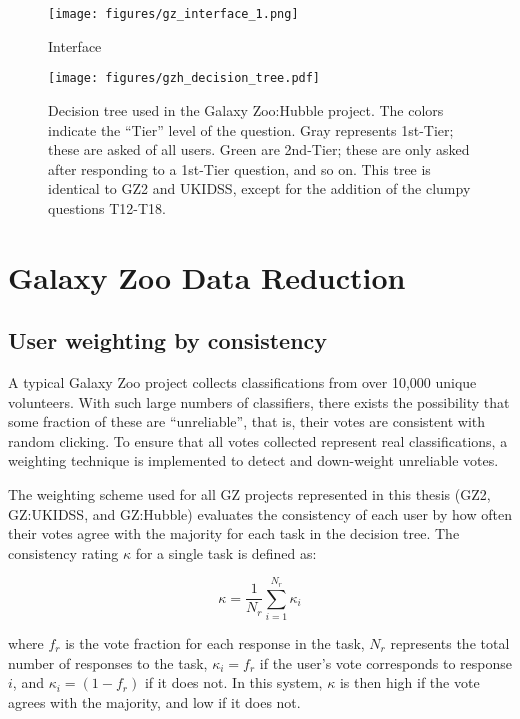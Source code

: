 \begin{figure}
\centering
\texttt{[image: figures/gz\_interface\_1.png]}
\caption{Interface}
\end{figure}

\begin{figure}
\centering
\texttt{[image: figures/gzh\_decision\_tree.pdf]}
\caption{Decision tree used in the Galaxy Zoo:Hubble project. The colors indicate the ``Tier'' level of the question. Gray represents 1st-Tier; these are asked of all users. Green are 2nd-Tier; these are only asked after responding to a 1st-Tier question, and so on. This tree is identical to GZ2 and UKIDSS, except for the addition of the clumpy questions T12-T18.}
\end{figure}

\section{Galaxy Zoo Data Reduction}
\subsection{User weighting by consistency}
A typical Galaxy Zoo project collects classifications from over 10,000 unique volunteers. With such large numbers of classifiers, there exists the possibility that some fraction of these are ``unreliable'', that is, their votes are consistent with random clicking. To ensure that all votes collected represent real classifications, a weighting technique is implemented to detect and down-weight unreliable votes.

The weighting scheme used for all GZ projects represented in this thesis (GZ2, GZ:UKIDSS, and GZ:Hubble) evaluates the consistency of each user by how often their votes agree with the majority for each task in the decision tree. The consistency rating $\kappa$ for a single task is defined as:

\begin{equation}
\kappa = \frac{1}{N_{r}}\sum_{i=1}^{N_{r}}{\kappa_{i}}
\label{eqn:kappa}
\end{equation}

where $f_{r}$ is the vote fraction for each response in the task, $N_{r}$ represents the total number of responses to the task, $\kappa_{i} = f_{r}$ if the user's vote corresponds to response $i$, and $\kappa_{i} = (1-f_{r})$ if it does not. In this system, $\kappa$ is then high if the vote agrees with the majority, and low if it does not. 

